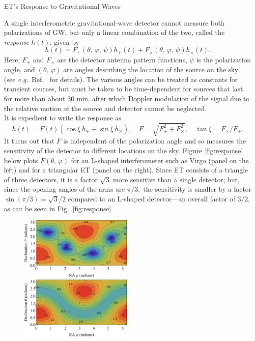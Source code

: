 {ET's Response to Gravitational Waves}
{
A single interferometric gravitational-wave detector cannot 
measure both polarizations of GW, but only a linear combination of the
two, called the \emph{response} $h(t)$, given by
\begin{equation}
h(t) = F_+(\theta,\, \varphi,\, \psi) h_+(t) +
       F_\times(\theta,\, \varphi,\, \psi) h_\times(t).
\label{eq:response}
\end{equation}
Here, $F_+$ and $F_\times$ are the detector antenna pattern functions,
$\psi$ is the polarization angle, and $(\theta,\,\varphi)$ are angles
describing the location of the source on the sky (see \emph{e.g.}\ 
Ref.~\cite{lrr-2009-2} for details). The various angles can be treated as
constants for transient sources, but must be taken to be 
time-dependent for sources that last for more than about 30 min, after
which Doppler modulation of the signal due to the relative motion 
of the source and detector cannot be neglected.
\\[5pt]
It is expedient to write the response as
\begin{equation}
h(t)=F(t)\left(\cos\xi\,h_+ + \sin\xi\,h_\times\right),\quad
F=\sqrt{F_+^2+F_\times^2},\quad \tan\xi=F_\times/F_+.
\end{equation}
It turns out that $F$ is independent of the polarization angle and
so measures the sensitivity of the detector to different locations on
the sky.  Figure \ref{fig:response} below plots $F(\theta,\,\varphi)$
for an L-shaped interferometer such as Virgo (panel on the left) 
and for a triangular ET (panel on the right). Since ET consists of 
a triangle of three detectors, it is a factor $\sqrt{3}$ more sensitive 
than a single detector; but, since the opening angles of the 
arms are $\pi/3,$ the sensitivity is smaller by a factor $\sin (\pi/3)= \sqrt{3}/2$ 
compared to an L-shaped detector---an overall factor of 3/2, as 
can be seen in Fig.~\ref{fig:response}.
\begin{figure}[H]
\centering
\includegraphics[width=0.495\textwidth]{./Sec_ET_ScienceCase/Virgo-AP.pdf}
\includegraphics[width=0.495\textwidth]{./Sec_ET_ScienceCase/ET-AP.pdf}

\end{figure}}
